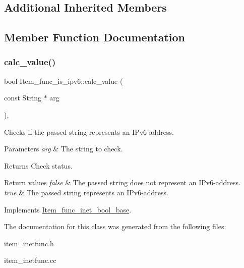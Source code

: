 \subsection*{Additional Inherited Members}


\subsection{Member Function Documentation}
\mbox{\label{classItem__func__is__ipv6_a83736a55b2a88846ed1595c855969c22}} 
\subsubsection{\texorpdfstring{calc\+\_\+value()}{calc\_value()}}
{\footnotesize\ttfamily bool Item\+\_\+func\+\_\+is\+\_\+ipv6\+::calc\+\_\+value (\begin{DoxyParamCaption}\item[{const String $\ast$}]{arg }\end{DoxyParamCaption})\hspace{0.3cm}{\ttfamily [protected]}, {\ttfamily [virtual]}}

Checks if the passed string represents an I\+Pv6-\/address.


\begin{DoxyParams}{Parameters}
{\em arg} & The string to check.\\
\hline
\end{DoxyParams}
\begin{DoxyReturn}{Returns}
Check status. 
\end{DoxyReturn}

\begin{DoxyRetVals}{Return values}
{\em false} & The passed string does not represent an I\+Pv6-\/address. \\
\hline
{\em true} & The passed string represents an I\+Pv6-\/address. \\
\hline
\end{DoxyRetVals}


Implements \mbox{\hyperlink{classItem__func__inet__bool__base}{Item\+\_\+func\+\_\+inet\+\_\+bool\+\_\+base}}.



The documentation for this class was generated from the following files\+:\begin{DoxyCompactItemize}
\item 
item\+\_\+inetfunc.\+h\item 
item\+\_\+inetfunc.\+cc\end{DoxyCompactItemize}
